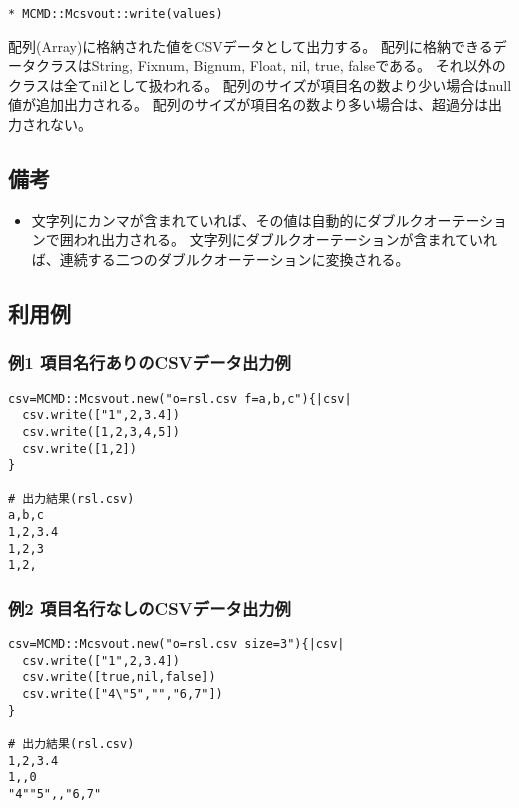 {\Large
\begin{verbatim}
* MCMD::Mcsvout::write(values)
\end{verbatim}
}

\begin{description}
\setlength{\itemindent}{0mm}
\item[values ] 配列(Array)に格納された値をCSVデータとして出力する。
配列に格納できるデータクラスはString, Fixnum, Bignum, Float, nil, true, falseである。
それ以外のクラスは全てnilとして扱われる。
配列のサイズが項目名の数より少い場合はnull値が追加出力される。
配列のサイズが項目名の数より多い場合は、超過分は出力されない。
\end{description}

\subsection{備考}
\begin{itemize}
\item 文字列にカンマが含まれていれば、その値は自動的にダブルクオーテーションで囲われ出力される。
文字列にダブルクオーテーションが含まれていれば、連続する二つのダブルクオーテーションに変換される。
\end{itemize}

\subsection{利用例}
\subsubsection*{例1 項目名行ありのCSVデータ出力例}

\begin{Verbatim}[baselinestretch=0.7,frame=single]
csv=MCMD::Mcsvout.new("o=rsl.csv f=a,b,c"){|csv|
  csv.write(["1",2,3.4])
  csv.write([1,2,3,4,5])
  csv.write([1,2])
}

# 出力結果(rsl.csv)
a,b,c
1,2,3.4
1,2,3
1,2,
\end{Verbatim}

\subsubsection*{例2 項目名行なしのCSVデータ出力例}

\begin{Verbatim}[baselinestretch=0.7,frame=single]
csv=MCMD::Mcsvout.new("o=rsl.csv size=3"){|csv|
  csv.write(["1",2,3.4])
  csv.write([true,nil,false])
  csv.write(["4\"5","","6,7"])
}

# 出力結果(rsl.csv)
1,2,3.4
1,,0
"4""5",,"6,7"
\end{Verbatim}

